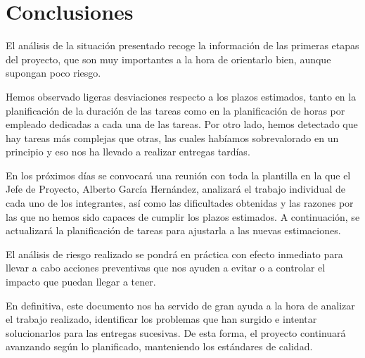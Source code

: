 \section{Conclusiones}
\par El análisis de la situación presentado recoge la información de las primeras etapas del proyecto, que son muy importantes a la hora de orientarlo bien, aunque supongan poco riesgo.
\par Hemos observado ligeras desviaciones respecto a los plazos estimados, tanto en la planificación de la duración de las tareas como en la planificación de horas por empleado dedicadas a cada una de las tareas. Por otro lado, hemos detectado que hay tareas más complejas que otras, las cuales habíamos sobrevalorado en un principio y eso nos ha llevado a realizar entregas tardías.
\par En los próximos días se convocará una reunión con toda la plantilla en la que el Jefe de Proyecto, Alberto García Hernández, analizará el trabajo individual de cada uno de los integrantes, así como las dificultades obtenidas y las razones por las que no hemos sido capaces de cumplir los plazos estimados. A continuación, se actualizará la planificación de tareas para ajustarla a las nuevas estimaciones.
\par El análisis de riesgo realizado se pondrá en práctica con efecto inmediato para llevar a cabo acciones preventivas que nos ayuden a evitar o a controlar el impacto que puedan llegar a tener.
\par En definitiva, este documento nos ha servido de gran ayuda a la hora de analizar el trabajo realizado, identificar los problemas que han surgido e intentar solucionarlos para las entregas sucesivas. De esta forma, el proyecto continuará avanzando según lo planificado, manteniendo los estándares de calidad.

